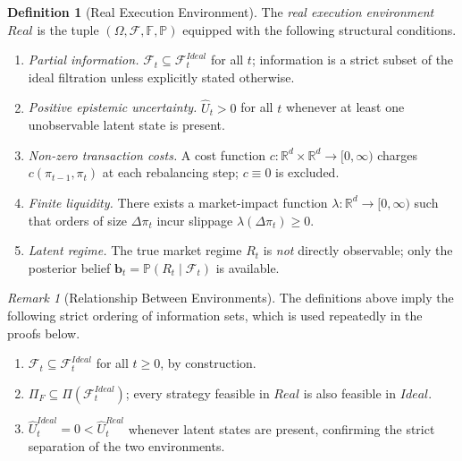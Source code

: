 \documentclass[12pt,openany]{book}
\numberwithin{equation}{chapter}
\theoremstyle{plain}
\theoremstyle{definition}
\newtheorem{definition}[theorem]{Definition}
\theoremstyle{remark}
\newtheorem{remark}[theorem]{Remark}
\numberwithin{equation}{chapter}
\theoremstyle{plain}
\newcommand{\Ideal}{\mathcal{E}_{I}}
\newcommand{\Real}{\mathcal{E}_{R}}
\def\Ideal{Ideal}%
\def\Real{Real}%
\begin{document}
\begin{definition}[Real Execution Environment]
\label{def:real}
The \emph{real execution environment} $\Real$ is the tuple
$(\Omega, \mathcal{F}, \mathbb{F}, \mathbb{P})$ equipped with
the following structural conditions.
\begin{enumerate}
  \item \emph{Partial information.}
        $\mathcal{F}_t \subseteq \mathcal{F}_t^{\Ideal}$ for all
        $t$; information is a strict subset of the ideal filtration
        unless explicitly stated otherwise.
  \item \emph{Positive epistemic uncertainty.}
        $\hat{U}_t > 0$ for all $t$ whenever at least one
        unobservable latent state is present.
  \item \emph{Non-zero transaction costs.}
        A cost function $c:\mathbb{R}^d \times \mathbb{R}^d
        \to [0,\infty)$ charges $c(\pi_{t-1},\pi_t)$ at each
        rebalancing step; $c \equiv 0$ is excluded.
  \item \emph{Finite liquidity.}
        There exists a market-impact function
        $\lambda: \mathbb{R}^d \to [0,\infty)$ such that
        orders of size $\Delta\pi_t$ incur slippage
        $\lambda(\Delta\pi_t) \geq 0$.
  \item \emph{Latent regime.}
        The true market regime $R_t$ is \emph{not} directly
        observable; only the posterior belief
        $\mathbf{b}_t = \mathbb{P}(R_t \mid \mathcal{F}_t)$
        is available.
\end{enumerate}
\end{definition}

\begin{remark}[Relationship Between Environments]
\label{rem:env-relationship}
The definitions above imply the following strict ordering of
information sets, which is used repeatedly in the proofs below.
\begin{enumerate}
  \item $\mathcal{F}_t \subseteq \mathcal{F}_t^{\Ideal}$ for all
        $t \geq 0$, by construction.
  \item $\Pi_F \subseteq \Pi(\mathcal{F}_t^{\Ideal})$; every
        strategy feasible in $\Real$ is also feasible in $\Ideal$.
  \item $\hat{U}_t^{\Ideal} = 0 < \hat{U}_t^{\Real}$ whenever
        latent states are present, confirming the strict
        separation of the two environments.
\end{enumerate}
\end{remark}
\end{document}
